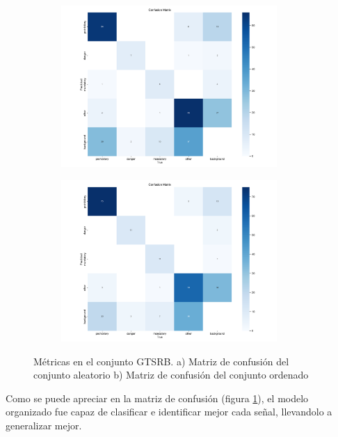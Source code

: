 \documentclass{article}
\begin{document}
\begin{figure}[h]
\begin{subfigure}[b]{0.5\textwidth}
\centering
\includegraphics[width=0.9\textwidth]{resources/random cuban confusion matrix.png}
\caption{}
\end{subfigure}
\begin{subfigure}[b]{0.5\textwidth}
\centering
\includegraphics[width=0.9\textwidth]{resources/sim cuban confusion matrix.png}
\caption{}
\end{subfigure}
\caption{Métricas en el conjunto GTSRB. a) Matriz de confusión del conjunto aleatorio b) Matriz de confusión del conjunto ordenado}
\label{fig:confusion random vs confusion sim}
\end{figure}

Como se puede apreciar en la matriz de confusión (figura \ref{fig:confusion random vs confusion sim}), el modelo organizado fue capaz de clasificar e identificar mejor cada señal, llevandolo a generalizar mejor.
\end{document}
